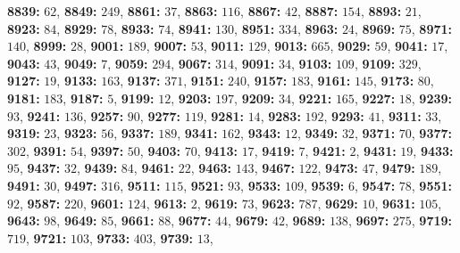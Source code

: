 \textsf{\bfseries 8839:} $62$, \textsf{\bfseries 8849:} $249$, \textsf{\bfseries 8861:} $37$, \textsf{\bfseries 8863:} $116$, \textsf{\bfseries 8867:} $42$, \textsf{\bfseries 8887:} $154$, \textsf{\bfseries 8893:} $21$, \textsf{\bfseries 8923:} $84$, \textsf{\bfseries 8929:} $78$, \textsf{\bfseries 8933:} $74$, \textsf{\bfseries 8941:} $130$, \textsf{\bfseries 8951:} $334$, \textsf{\bfseries 8963:} $24$, \textsf{\bfseries 8969:} $75$, \textsf{\bfseries 8971:} $140$, \textsf{\bfseries 8999:} $28$, \textsf{\bfseries 9001:} $189$, \textsf{\bfseries 9007:} $53$, \textsf{\bfseries 9011:} $129$, \textsf{\bfseries 9013:} $665$, \textsf{\bfseries 9029:} $59$, \textsf{\bfseries 9041:} $17$, \textsf{\bfseries 9043:} $43$, \textsf{\bfseries 9049:} $7$, \textsf{\bfseries 9059:} $294$, \textsf{\bfseries 9067:} $314$, \textsf{\bfseries 9091:} $34$, \textsf{\bfseries 9103:} $109$, \textsf{\bfseries 9109:} $329$, \textsf{\bfseries 9127:} $19$, \textsf{\bfseries 9133:} $163$, \textsf{\bfseries 9137:} $371$, \textsf{\bfseries 9151:} $240$, \textsf{\bfseries 9157:} $183$, \textsf{\bfseries 9161:} $145$, \textsf{\bfseries 9173:} $80$, \textsf{\bfseries 9181:} $183$, \textsf{\bfseries 9187:} $5$, \textsf{\bfseries 9199:} $12$, \textsf{\bfseries 9203:} $197$, \textsf{\bfseries 9209:} $34$, \textsf{\bfseries 9221:} $165$, \textsf{\bfseries 9227:} $18$, \textsf{\bfseries 9239:} $93$, \textsf{\bfseries 9241:} $136$, \textsf{\bfseries 9257:} $90$, \textsf{\bfseries 9277:} $119$, \textsf{\bfseries 9281:} $14$, \textsf{\bfseries 9283:} $192$, \textsf{\bfseries 9293:} $41$, \textsf{\bfseries 9311:} $33$, \textsf{\bfseries 9319:} $23$, \textsf{\bfseries 9323:} $56$, \textsf{\bfseries 9337:} $189$, \textsf{\bfseries 9341:} $162$, \textsf{\bfseries 9343:} $12$, \textsf{\bfseries 9349:} $32$, \textsf{\bfseries 9371:} $70$, \textsf{\bfseries 9377:} $302$, \textsf{\bfseries 9391:} $54$, \textsf{\bfseries 9397:} $50$, \textsf{\bfseries 9403:} $70$, \textsf{\bfseries 9413:} $17$, \textsf{\bfseries 9419:} $7$, \textsf{\bfseries 9421:} $2$, \textsf{\bfseries 9431:} $19$, \textsf{\bfseries 9433:} $95$, \textsf{\bfseries 9437:} $32$, \textsf{\bfseries 9439:} $84$, \textsf{\bfseries 9461:} $22$, \textsf{\bfseries 9463:} $143$, \textsf{\bfseries 9467:} $122$, \textsf{\bfseries 9473:} $47$, \textsf{\bfseries 9479:} $189$, \textsf{\bfseries 9491:} $30$, \textsf{\bfseries 9497:} $316$, \textsf{\bfseries 9511:} $115$, \textsf{\bfseries 9521:} $93$, \textsf{\bfseries 9533:} $109$, \textsf{\bfseries 9539:} $6$, \textsf{\bfseries 9547:} $78$, \textsf{\bfseries 9551:} $92$, \textsf{\bfseries 9587:} $220$, \textsf{\bfseries 9601:} $124$, \textsf{\bfseries 9613:} $2$, \textsf{\bfseries 9619:} $73$, \textsf{\bfseries 9623:} $787$, \textsf{\bfseries 9629:} $10$, \textsf{\bfseries 9631:} $105$, \textsf{\bfseries 9643:} $98$, \textsf{\bfseries 9649:} $85$, \textsf{\bfseries 9661:} $88$, \textsf{\bfseries 9677:} $44$, \textsf{\bfseries 9679:} $42$, \textsf{\bfseries 9689:} $138$, \textsf{\bfseries 9697:} $275$, \textsf{\bfseries 9719:} $719$, \textsf{\bfseries 9721:} $103$, \textsf{\bfseries 9733:} $403$, \textsf{\bfseries 9739:} $13$, 
